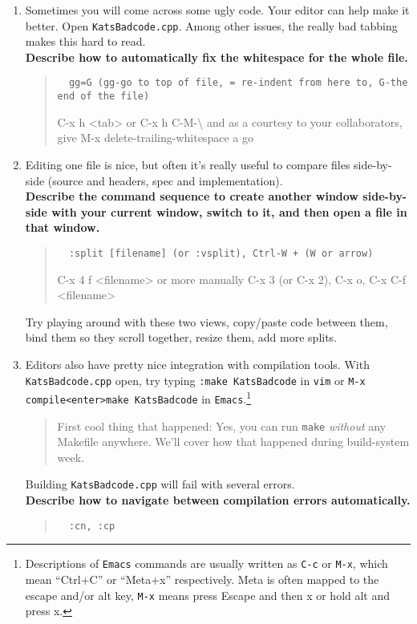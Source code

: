 \documentclass{article}
\begin{document}
\begin{enumerate}
  \item Sometimes you will come across some ugly code. Your editor can help
    make it better. Open \texttt{KatsBadcode.cpp}. Among other issues, the
    really bad tabbing makes this hard to read.\\
    \textbf{Describe how to automatically fix the whitespace for the whole file.}
    \begin{quote}\tt
      {\color{blue} gg=G (gg-go to top of file, = re-indent from here to, G-the end of the file)}

      {\color{red} C-x h <tab>} or {\color{red}C-x h C-M-\textbackslash}
      and as a courtesy to your collaborators, \newline give {\color{red} M-x delete-trailing-whitespace} a go
    \end{quote}
  \item Editing one file is nice, but often it's really useful to compare
    files side-by-side (source and headers, spec and implementation).\\
    \textbf{Describe the command sequence to create another window side-by-side with your current window, switch to it, and then open a file in that window.}
    \begin{quote}\tt
      {\color{blue} :split [filename] (or :vsplit), Ctrl-W + (W or arrow)}

      {\color{red} C-x 4 f <filename>} or more manually {\color{red} C-x 3 (or C-x 2), C-x o, C-x C-f <filename>}
    \end{quote}

    Try playing around with these two views, copy/paste code between them,
    bind them so they scroll together, resize them, add more splits.\\
  \item Editors also have pretty nice integration with compilation tools. With
    \texttt{KatsBadcode.cpp} open, try typing \texttt{:make KatsBadcode} in
    \texttt{vim} or \texttt{M-x compile<enter>make KatsBadcode} in
    \texttt{Emacs}.\footnote{
      Descriptions of \texttt{Emacs} commands are usually written as
      \texttt{C-c} or \texttt{M-x}, which mean ``Ctrl+C'' or ``Meta+x''
      respectively. Meta is often mapped to the escape and/or alt key,
      \texttt{M-x} means press Escape and then x or hold alt and press x.
    }
    \begin{quote}
      First cool thing that happened: Yes, you can run \texttt{make}
      \emph{without} any Makefile anywhere. We'll cover how that happened
      during build-system week.
    \end{quote}
    Building \texttt{KatsBadcode.cpp} will fail with several errors.\\
    \textbf{Describe how to navigate between compilation errors automatically.}
    \begin{quote}\tt
      {\color{blue} :cn, :cp}


\end{quote}
\end{enumerate}
\end{document}
